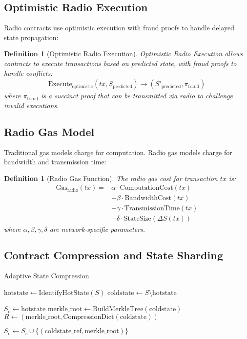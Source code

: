 \documentclass[11pt,a4paper]{article}
\newtheorem{definition}[theorem]{Definition}
\begin{document}
\subsection{Optimistic Radio Execution}

Radio contracts use optimistic execution with fraud proofs to handle delayed state propagation:

\begin{definition}[Optimistic Radio Execution]
Optimistic Radio Execution allows contracts to execute transactions based on predicted state, with fraud proofs to handle conflicts:
\begin{align}
\text{Execute}_{\text{optimistic}}(tx, S_{\text{predicted}}) \rightarrow (S'_{\text{predicted}}, \pi_{\text{fraud}})
\end{align}
where $\pi_{\text{fraud}}$ is a succinct proof that can be transmitted via radio to challenge invalid executions.
\end{definition}

\subsection{Radio Gas Model}

Traditional gas models charge for computation. Radio gas models charge for bandwidth and transmission time:

\begin{definition}[Radio Gas Function]
The radio gas cost for transaction $tx$ is:
\begin{align}
\text{Gas}_{\text{radio}}(tx) = &\alpha \cdot \text{ComputationCost}(tx) \\
&+ \beta \cdot \text{BandwidthCost}(tx) \\
&+ \gamma \cdot \text{TransmissionTime}(tx) \\
&+ \delta \cdot \text{StateSize}(\Delta S(tx))
\end{align}
where $\alpha, \beta, \gamma, \delta$ are network-specific parameters.
\end{definition}

\subsection{Contract Compression and State Sharding}

\begin{algorithm}[H]
\SetAlgoLined
{}
\caption{Adaptive State Compression}


$\text{hotstate} \leftarrow \text{IdentifyHotState}(S)$\;
$\text{coldstate} \leftarrow S \setminus \text{hotstate}$\;

$S_c \leftarrow \text{hotstate}$\;
$\text{merkle\_root} \leftarrow \text{BuildMerkleTree}(\text{coldstate})$\;
$R \leftarrow (\text{merkle\_root}, \text{CompressionDict}(\text{coldstate}))$\;

$S_c \leftarrow S_c \cup \{(\text{coldstate\_ref}, \text{merkle\_root})\}$\;
\;
\end{algorithm}
\end{document}
